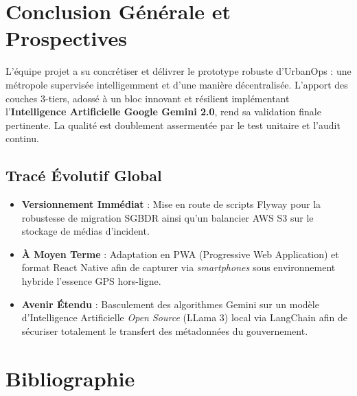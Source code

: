 \documentclass[12pt,a4paper,oneside]{book} %
\begin{document}
\chapter{Conclusion Générale et Prospectives}
\label{chap:concl}

L'équipe projet a su concrétiser et délivrer le prototype robuste d'UrbanOps : une métropole supervisée intelligemment et d'une manière décentralisée. L'apport des couches 3-tiers, adossé à un bloc innovant et résilient implémentant l'\textbf{Intelligence Artificielle Google Gemini 2.0}, rend sa validation finale pertinente. La qualité est doublement assermentée par le test unitaire et l'audit continu.

\section*{Tracé Évolutif Global}
\begin{itemize}
  \item \textbf{Versionnement Immédiat} : Mise en route de scripts Flyway pour la robustesse de migration SGBDR ainsi qu'un balancier AWS S3 sur le stockage de médias d'incident.
  \item \textbf{À Moyen Terme} : Adaptation en PWA (Progressive Web Application) et format React Native afin de capturer via \textit{smartphones} sous environnement hybride l'essence GPS hors-ligne.
  \item \textbf{Avenir Étendu} : Basculement des algorithmes Gemini sur un modèle d'Intelligence Artificielle \textit{Open Source} (LLama 3) local via LangChain afin de sécuriser totalement le transfert des métadonnées du gouvernement.
\end{itemize}

\clearpage
\chapter*{Bibliographie}
\end{document}

